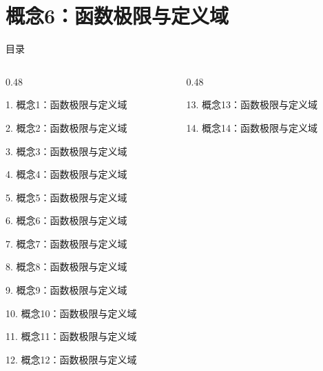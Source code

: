 \documentclass[aspectratio=169,10pt,fontset=fandol]{ctexbeamer}
\begin{document}
\section{概念6：函数极限与定义域}
\begin{frame}[t,fragile]{目录}
\small
\begin{columns}[T,onlytextwidth]
\begin{column}{0.48\textwidth}
{\color{black}\small 1. 概念1：函数极限与定义域\par}\vspace{0.22em}
{\color{black}\small 2. 概念2：函数极限与定义域\par}\vspace{0.22em}
{\color{black}\small 3. 概念3：函数极限与定义域\par}\vspace{0.22em}
{\color{black}\small 4. 概念4：函数极限与定义域\par}\vspace{0.22em}
{\color{black}\small 5. 概念5：函数极限与定义域\par}\vspace{0.22em}
{\color{blue}\small 6. 概念6：函数极限与定义域\par}\vspace{0.22em}
{\color{gray!40}\small 7. 概念7：函数极限与定义域\par}\vspace{0.22em}
{\color{gray!40}\small 8. 概念8：函数极限与定义域\par}\vspace{0.22em}
{\color{gray!40}\small 9. 概念9：函数极限与定义域\par}\vspace{0.22em}
{\color{gray!40}\small 10. 概念10：函数极限与定义域\par}\vspace{0.22em}
{\color{gray!40}\small 11. 概念11：函数极限与定义域\par}\vspace{0.22em}
{\color{gray!40}\small 12. 概念12：函数极限与定义域\par}\vspace{0.22em}
\end{column}
\begin{column}{0.48\textwidth}
{\color{gray!40}\small 13. 概念13：函数极限与定义域\par}\vspace{0.22em}
{\color{gray!40}\small 14. 概念14：函数极限与定义域\par}\vspace{0.22em}

\end{column}
\end{columns}
\end{frame}
\end{document}
